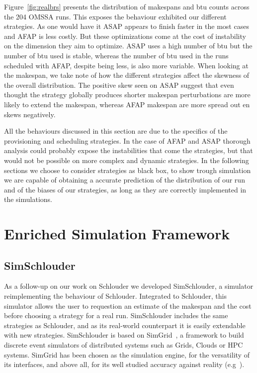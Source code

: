 \documentclass[10pt,conference,compsocconf]{IEEEtran}
\begin{document}
Figure~\ref{fig:realbrs} presents the distribution of makespans and \ac{btu}
counts across the 204 OMSSA runs. This exposes the behaviour exhibited our
different strategies. As one would have it ASAP appears to finish faster in the
most cases and AFAP is less costly. But these optimizations come at the cost of
instability on the dimension they aim to optimize. ASAP uses a high number of
\ac{btu} but the number of \ac{btu} used is stable, whereas the number of
\ac{btu} used in the runs scheduled with AFAP, despite being less, is also
more variable. When looking at the makespan, we take note of how the different
strategies affect the skewness of the overall distribution. The positive skew
seen on ASAP suggest that even thought the strategy globally produces shorter
makespan perturbations are more likely to extend the makespan, whereas AFAP
makespan are more spread out en skews negatively.

All the behaviours discussed in this section are due to the specifics of the
provisioning and scheduling strategies. In the case of AFAP and ASAP thorough
analysis could probably expose the instabilities that come the strategies, but
that would not be possible on more complex and dynamic strategies. In
the following sections we choose to consider strategies as black box, to show
trough simulation we are capable of obtaining a accurate prediction of the
distribution of our run and of the biases of our strategies, as long as they are
correctly implemented in the simulations.

\section{Enriched Simulation Framework}

\subsection{SimSchlouder}

As a follow-up on our work on Schlouder we developed SimSchlouder, a simulator
reimplementing the behaviour of Schlouder. Integrated to Schlouder, this
simulator allows the user to requestion an estimate of the makespan and the cost
before choosing a strategy for a real run. SimSchlouder includes the same
strategies as Schlouder, and as its real-world counterpart it is easily
extendable with new strategies. SimSchlouder is based on SimGrid~\cite{simgrid},
a framework to build discrete event simulators of distributed systems such as
Grids, Clouds or HPC systems. SimGrid has been chosen as the simulation engine,
for the versatility of its interfaces, and above all, for its well studied
accuracy against reality (e.g~\cite{StanisicTLVM15,VelhoSCL13}).
\end{document}
